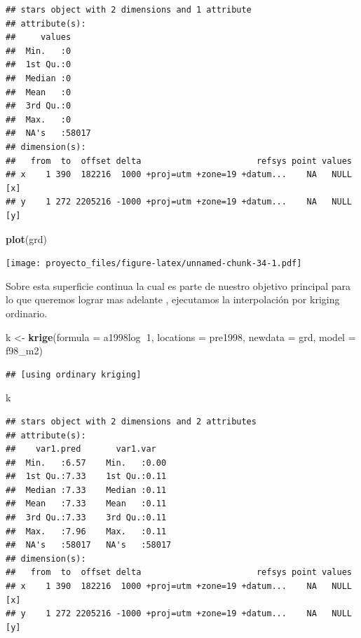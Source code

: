 \documentclass[11pt,]{article}
\newenvironment{Shaded}{\begin{snugshade}}{\end{snugshade}}
\newcommand{\KeywordTok}[1]{\textcolor[rgb]{0.13,0.29,0.53}{\textbf{#1}}}
\newcommand{\DataTypeTok}[1]{\textcolor[rgb]{0.13,0.29,0.53}{#1}}
\newcommand{\DecValTok}[1]{\textcolor[rgb]{0.00,0.00,0.81}{#1}}
\newcommand{\StringTok}[1]{\textcolor[rgb]{0.31,0.60,0.02}{#1}}
\newcommand{\OperatorTok}[1]{\textcolor[rgb]{0.81,0.36,0.00}{\textbf{#1}}}
\newcommand{\NormalTok}[1]{#1}
\begin{document}
\begin{verbatim}
## stars object with 2 dimensions and 1 attribute
## attribute(s):
##     values      
##  Min.   :0      
##  1st Qu.:0      
##  Median :0      
##  Mean   :0      
##  3rd Qu.:0      
##  Max.   :0      
##  NA's   :58017  
## dimension(s):
##   from  to  offset delta                       refsys point values    
## x    1 390  182216  1000 +proj=utm +zone=19 +datum...    NA   NULL [x]
## y    1 272 2205216 -1000 +proj=utm +zone=19 +datum...    NA   NULL [y]
\end{verbatim}

\begin{Shaded}
\begin{Highlighting}[]
\KeywordTok{plot}\NormalTok{(grd)}
\end{Highlighting}
\end{Shaded}

\texttt{[image: proyecto\_files/figure-latex/unnamed-chunk-34-1.pdf]}

Sobre esta superficie continua la cual es parte de nuestro objetivo
principal para lo que queremos lograr mas adelante , ejecutamos la
interpolación por kriging ordinario.

\begin{Shaded}
\begin{Highlighting}[]
\NormalTok{k <-}\StringTok{ }\KeywordTok{krige}\NormalTok{(}\DataTypeTok{formula =}\NormalTok{ a1998log}\OperatorTok{~}\DecValTok{1}\NormalTok{, }\DataTypeTok{locations =}\NormalTok{ pre1998, }\DataTypeTok{newdata =}\NormalTok{ grd, }\DataTypeTok{model =}\NormalTok{ f98_m2)}
\end{Highlighting}
\end{Shaded}

\begin{verbatim}
## [using ordinary kriging]
\end{verbatim}

\begin{Shaded}
\begin{Highlighting}[]
\NormalTok{k}
\end{Highlighting}
\end{Shaded}

\begin{verbatim}
## stars object with 2 dimensions and 2 attributes
## attribute(s):
##    var1.pred       var1.var     
##  Min.   :6.57    Min.   :0.00   
##  1st Qu.:7.33    1st Qu.:0.11   
##  Median :7.33    Median :0.11   
##  Mean   :7.33    Mean   :0.11   
##  3rd Qu.:7.33    3rd Qu.:0.11   
##  Max.   :7.96    Max.   :0.11   
##  NA's   :58017   NA's   :58017  
## dimension(s):
##   from  to  offset delta                       refsys point values    
## x    1 390  182216  1000 +proj=utm +zone=19 +datum...    NA   NULL [x]
## y    1 272 2205216 -1000 +proj=utm +zone=19 +datum...    NA   NULL [y]
\end{verbatim}
\end{document}
